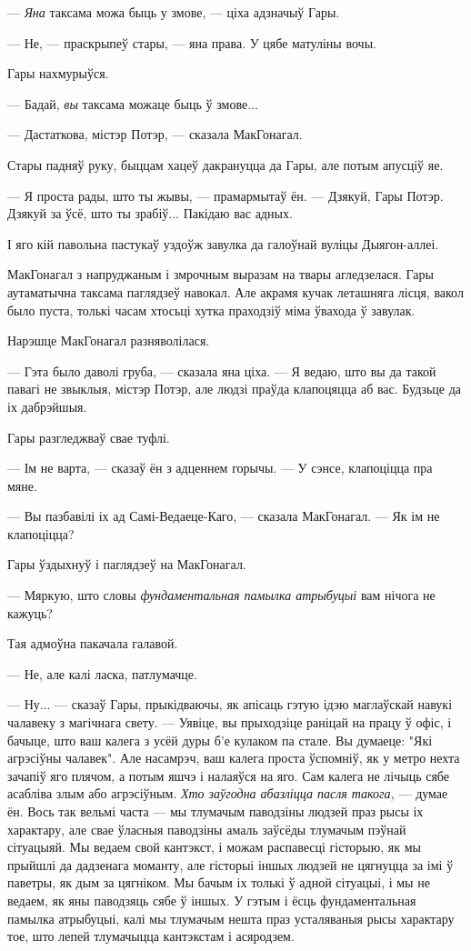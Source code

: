 --- \emph{Яна} таксама можа быць у змове, --- ціха адзначыў Гары.

--- Не, --- праскрыпеў стары, --- яна права. У цябе матуліны вочы.

Гары нахмурыўся.

--- Бадай, \emph{вы} таксама можаце быць ў змове...

--- Дастаткова, містэр Потэр, --- сказала МакГонагал.

Стары падняў руку, быццам хацеў дакрануцца да Гары, але потым апусціў яе.

--- Я проста рады, што ты жывы, --- прамармытаў ён. --- Дзякуй, Гары Потэр. Дзякуй 
за ўсё, што ты зрабіў... Пакідаю вас адных.

І яго кій павольна пастукаў уздоўж завулка да галоўнай вуліцы Дыягон-аллеі.

МакГонагал з напруджаным і змрочным выразам на твары агледзелася. Гары аутаматычна таксама
паглядзеў навокал. Але акрамя кучак леташняга лісця, вакол было пуста, толькі часам 
хтосьці хутка праходзіў міма ўвахода ў завулак. 

Нарэшце МакГонагал разняволілася. 

--- Гэта было даволі груба, --- сказала яна ціха. --- Я ведаю, што вы да такой павагі не звыклыя,
містэр Потэр, але людзі праўда клапоцяцца аб вас. Будзьце да іх дабрэйшыя.

Гары разгледжваў свае туфлі.

--- Ім не варта, --- сказаў ён з адценнем горычы. --- У сэнсе, клапоціцца пра мяне.

--- Вы пазбавілі іх ад Самі-Ведаеце-Каго, --- сказала МакГонагал. --- Як ім не клапоціцца?

Гары ўздыхнуў і паглядзеў на МакГонагал. 

--- Мяркую, што словы \emph{фундаментальная памылка атрыбуцыі} вам нічога не кажуць?

Тая адмоўна пакачала галавой. 

--- Не, але калі ласка, патлумачце.

--- Ну... --- сказаў Гары, прыкідваючы, як апісаць гэтую ідэю маглаўскай навукі чалавеку з
магічнага свету. --- Уявіце, вы прыходзіце раніцай на працу ў офіс, і бачыце, што ваш 
калега з усёй дуры б'е кулаком па стале. Вы думаеце: "Які агрэсіўны чалавек". Але насамрэч,
ваш калега проста ўспомніў, як у метро нехта зачапіў яго плячом, а потым яшчэ і налаяўся на яго.
Сам калега не лічыць сябе асабліва злым або агрэсіўным. \emph{Хто заўгодна абазліцца 
пасля такога,} --- думае ён. Вось так вельмі часта --- мы тлумачым паводзіны людзей праз
рысы іх характару, але свае ўласныя паводзіны амаль заўсёды тлумачым 
пэўнай сітуацыяй. Мы ведаем свой кантэкст, і можам распавесці гісторыю, як мы прыйшлі да дадзенага
моманту, але гісторыі іншых людзей не цягнуцца за імі ў паветры, як дым за цягніком. Мы бачым 
іх толькі ў адной сітуацыі, і мы не ведаем, як яны паводзяць сябе ў іншых. У гэтым і ёсць 
фундаментальная памылка атрыбуцыі, калі мы тлумачым нешта праз усталяваныя рысы характару тое,
што лепей тлумачыцца кантэкстам і асяродзем.

